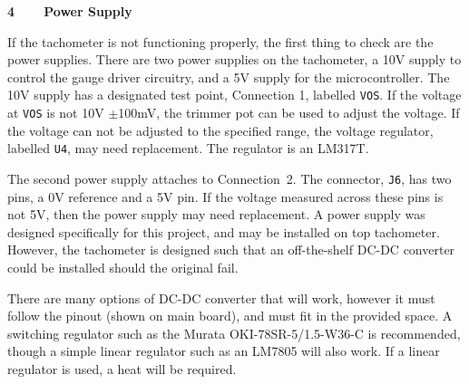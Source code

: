 {\large\textbf{4~~~~Power Supply}}

If the tachometer is not functioning properly, the first thing to check are the power supplies. There are two power supplies on the tachometer, a 10V supply to control the gauge driver circuitry, and a 5V supply for the microcontroller. The 10V supply has a designated test point, Connection 1, labelled \verb|VOS|. If the voltage at \verb|VOS| is not 10V $\pm$100mV, the  trimmer pot can be used to adjust the voltage. If the voltage can not be adjusted to the specified range, the voltage regulator, labelled \verb|U4|, may need replacement. The regulator is an LM317T.

The second power supply attaches to Connection~2. The connector, \verb|J6|, has two pins, a 0V reference and a  5V pin. If the voltage measured across these pins is not 5V, then the power supply may need replacement. A power supply was designed specifically for this project, and may be installed on top tachometer. However, the tachometer is designed such that an off-the-shelf DC-DC converter could be installed should the original fail.

There are many options of DC-DC converter that will work, however it must follow the pinout (shown on main board), and must fit in the provided space. A switching regulator such as the Murata OKI-78SR-5/1.5-W36-C is recommended, though a simple linear regulator such as an LM7805 will also work. If a linear regulator is used, a heat will be required.